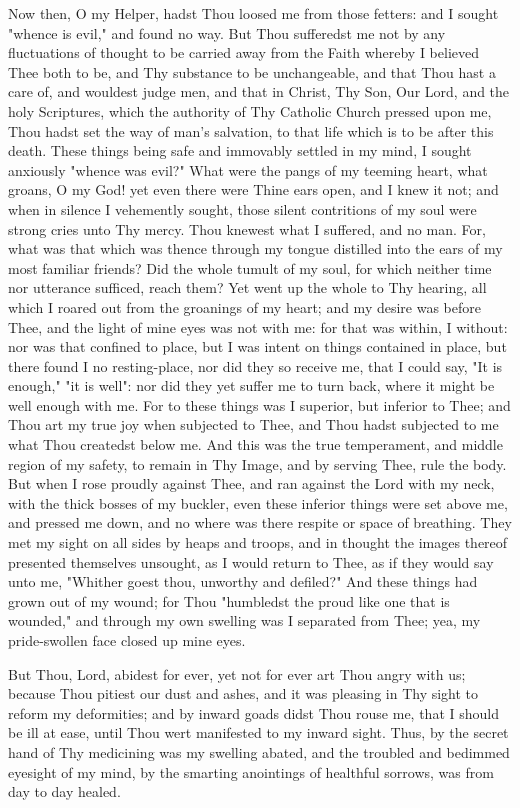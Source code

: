 \documentclass[b5paper,openright,12pt,twoside]{book}
\begin{document}
Now then, O my Helper, hadst Thou loosed me from those fetters: and I
sought "whence is evil," and found no way. But Thou sufferedst me not by
any fluctuations of thought to be carried away from the Faith whereby I
believed Thee both to be, and Thy substance to be unchangeable, and that
Thou hast a care of, and wouldest judge men, and that in Christ, Thy
Son, Our Lord, and the holy Scriptures, which the authority of Thy
Catholic Church pressed upon me, Thou hadst set the way of man's
salvation, to that life which is to be after this death. These things
being safe and immovably settled in my mind, I sought anxiously "whence
was evil?" What were the pangs of my teeming heart, what groans, O my
God! yet even there were Thine ears open, and I knew it not; and when
in silence I vehemently sought, those silent contritions of my soul were
strong cries unto Thy mercy. Thou knewest what I suffered, and no man.
For, what was that which was thence through my tongue distilled into the
ears of my most familiar friends? Did the whole tumult of my soul, for
which neither time nor utterance sufficed, reach them? Yet went up the
whole to Thy hearing, all which I roared out from the groanings of my
heart; and my desire was before Thee, and the light of mine eyes was not
with me: for that was within, I without: nor was that confined to place,
but I was intent on things contained in place, but there found I no
resting-place, nor did they so receive me, that I could say, "It is
enough," "it is well": nor did they yet suffer me to turn back, where
it might be well enough with me. For to these things was I superior, but
inferior to Thee; and Thou art my true joy when subjected to Thee, and
Thou hadst subjected to me what Thou createdst below me. And this was
the true temperament, and middle region of my safety, to remain in
Thy Image, and by serving Thee, rule the body. But when I rose proudly
against Thee, and ran against the Lord with my neck, with the thick
bosses of my buckler, even these inferior things were set above me, and
pressed me down, and no where was there respite or space of breathing.
They met my sight on all sides by heaps and troops, and in thought the
images thereof presented themselves unsought, as I would return to
Thee, as if they would say unto me, "Whither goest thou, unworthy
and defiled?" And these things had grown out of my wound; for Thou
"humbledst the proud like one that is wounded," and through my own
swelling was I separated from Thee; yea, my pride-swollen face closed up
mine eyes.

But Thou, Lord, abidest for ever, yet not for ever art Thou angry with
us; because Thou pitiest our dust and ashes, and it was pleasing in Thy
sight to reform my deformities; and by inward goads didst Thou rouse me,
that I should be ill at ease, until Thou wert manifested to my inward
sight. Thus, by the secret hand of Thy medicining was my swelling
abated, and the troubled and bedimmed eyesight of my mind, by the
smarting anointings of healthful sorrows, was from day to day healed.
\end{document}
